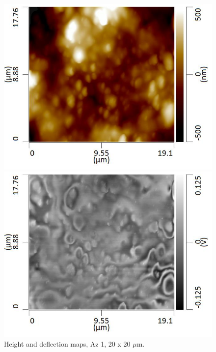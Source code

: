 \begin{figure}[H]
\centering
\begin{minipage}{.45\textwidth}
  \centering
  \includegraphics[width=\linewidth]{Az1_tapping_mode_240521_height_5}
\end{minipage}
\begin{minipage}{.45\textwidth}
  \centering
  \includegraphics[width=\linewidth]{Az1_tapping_mode_240521_def_5}
\end{minipage}
\caption[Height and deflection maps, Az 1]{Height and deflection maps, Az 1, 20 x 20 $\mu$m.}
\label{fig:afm_az1_height_def_5}
\end{figure}

